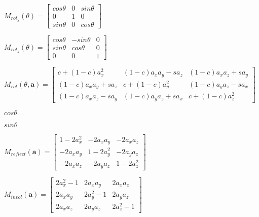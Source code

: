 \documentclass{article}
\def\lthtmlcheckvsize{\ifdim\ht\sizebox<\vsize 
  \ifdim\wd\sizebox<\hsize\expandafter\hfill\fi \expandafter\vfill
  \else\expandafter\vss\fi}%
\begin{document}
{\newpage\clearpage
{}%
$ M_{rot_y}(\theta) = \begin{bmatrix}
 cos \theta & 0 & sin \theta \\
0 & 1 & 0 \\
sin \theta & 0 & cos \theta
\end{bmatrix}
$%
\lthtmlindisplaymathZ
\lthtmlcheckvsize\clearpage}

{\newpage\clearpage
{}%
$ M_{rot_z}(\theta) = \begin{bmatrix}
cos \theta & -sin \theta & 0 \\
sin \theta & cos \theta & 0 \\
0 & 0 & 1
\end{bmatrix}
$%
\lthtmlindisplaymathZ
\lthtmlcheckvsize\clearpage}

{\newpage\clearpage
{}%
$ M_{rot}(\theta, \textbf{a}) = \begin{bmatrix}
c + (1-c)a_x^2 & (1-c)a_x a_y - s a_z & (1-c)a_x a_z + s a_y \\
(1-c)a_x a_y + s a_z & c + (1-c)a_y^2 & (1-c)a_y a_z - s a_x \\
(1-c)a_x a_z - s a_y & (1-c)a_y a_z + s a_x & c + (1-c) a_z^2
\end{bmatrix}
$%
\lthtmlindisplaymathZ
\lthtmlcheckvsize\clearpage}

{\newpage\clearpage
{}%
$ cos \theta$%
\lthtmlindisplaymathZ
\lthtmlcheckvsize\clearpage}

{\newpage\clearpage
{}%
$ sin \theta $%
\lthtmlindisplaymathZ
\lthtmlcheckvsize\clearpage}

{\newpage\clearpage
{}%
$ M_{reflect}(\textbf{a}) = \begin{bmatrix}
1 - 2a_x^2 & -2a_x a_y & -2a_x a_z \\
-2a_x a_y & 1 -2a_y^2 & -2a_y a_z \\
-2a_x a_z & -2a_y a_z & 1 - 2a_z^2
\end{bmatrix}
$%
\lthtmlindisplaymathZ
\lthtmlcheckvsize\clearpage}

{\newpage\clearpage
{}%
$ M_{invol}(\textbf{a}) = \begin{bmatrix}
2a_x^2 - 1 & 2a_x a_y & 2a_x a_z \\
2a_x a_y & 2a_y^2 - 1 & 2a_y a_z \\
2a_x a_z & 2a_y a_z & 2a_z^2 - 1
\end{bmatrix}
$%
\lthtmlindisplaymathZ
\lthtmlcheckvsize\clearpage}
\end{document}

